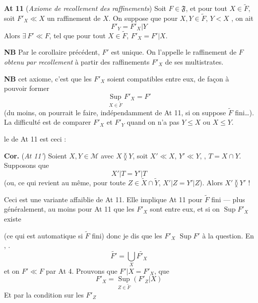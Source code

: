 \documentclass[11pt,a4paper]{article}
\begin{document}
\textbf{At 11} (\emph{Axiome de recollement des raffinements}) Soit $F \in \mathfrak{F}$, et pour tout $X \in \widetilde{F}$, soit $F'_X \ll X$ \struck{\ill{}} un raffinement de $X$. On suppose que pour $X, Y \in \widetilde{F}$, $Y < X$ , on ait 
\[
  F'_Y = F'_X | Y
\]
Alors $\exists\, F' \ll F$, tel que pour tout $X \in \widetilde{F}$, $F'_X = F' | X$.

\textbf{NB} Par le corollaire précédent, $F'$ est unique. On l'appelle le raffinement de $F$ \emph{obtenu par recollement} à partir des raffinements $F'_X$ de ses multistrates.

\textbf{NB}   \struck{\ill{}} cet axiome, c'est que les $F'_X$  soient compatibles entre eux, \struck{\ill{}} de façon à pouvoir former
\[
  \operatorname*{Sup}_{X \in \widetilde{F}} F'_X = F'
\]
(du moins, on pourrait le faire, indépendamment de At 11, si on suppose $\widetilde{F}$ fini\ldots). La difficulté est de comparer $F'_X$ et $F'_Y$ quand on n'a pas $Y \leq X$ ou $X \leq Y$.

 le  de At 11 est ceci :

\textbf{Cor.} (\emph{At 11'}) Soient $X, Y \in \mathcal{M}$ avec $X \between Y$, soit $X' \ll X$, $Y' \ll Y$, ,  $T = X \cap Y$. Supposons que
\[
  X' | T = Y' | T
\]
(ou, ce qui revient au même, pour toute $Z \in \widetilde{X} \cap \widetilde{Y}$, $X' | Z = Y' | Z$). Alors $X' \between Y'$ !

Ceci est une variante  affaiblie de At 11. Elle implique At 11 \ill{} pour $\widetilde{F}$ fini --- plus généralement, au moins pour At 11 que les $F'_X$ sont  entre eux, et si on \ill{} $\operatorname{Sup} F'_X$ existe

(ce qui est automatique si \ill{} \ill{} $\widetilde{F}$ fini) donc je dis que les $F'_X$  \ill{} $\operatorname{Sup} F'$  à la question. En \ill{}, \ill{} \ill{}.
\[
  \widetilde{F'} = \bigcup_{X} \widetilde{F'_X}
\]
et on \ill{} $F' \ll F$ par At 4. Prouvons  que $F' | X = F'_X$, \ill{} \ill{} que
\[
  F'_X = \operatorname*{Sup}_{Z \in \widetilde{F}} (F'_Z | X)
\]
Et par la condition \ill{} sur les $F'_Z$ \ill{} \ill{}
\end{document}
